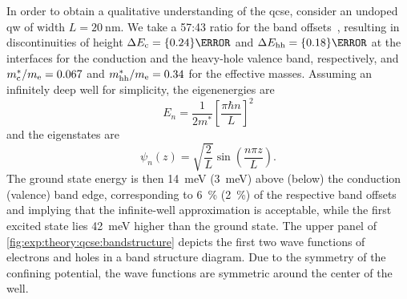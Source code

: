 In order to obtain a qualitative understanding of the \gls{qcse}, consider an undoped  \gls{qw} of width $L = \qty{20}{\nano\meter}$.
We take a 57:43 ratio for the band offsets~\cite{Miller1984a}, resulting in discontinuities of height $\Delta E_{\mr{c}} = \qty{0.24}{\electronvolt}$ and $\Delta E_{\mr{hh}} = \qty{0.18}{\electronvolt}$ at the interfaces for the conduction and the heavy-hole valence band, respectively, and $m^\ast_{\mathrm{c}}/m_{\mathrm{e}} = \num{0.067}$ and $m^\ast_{\mathrm{hh}}/m_{\mathrm{e}} = \num{0.34}$ for the effective masses.
Assuming an infinitely deep well for simplicity, the eigenenergies are
\begin{equation}\label{eq:exp:theory:square_well:eps}
    E_n = \frac{1}{2 m^\ast}\left[\frac{\pi\hbar n}{L}\right]^2
\end{equation}
and the eigenstates are
\begin{equation}\label{eq:exp:theory:square_well:psi}
    \psi_n(z) = \sqrt{\frac{2}{L}}\sin(\frac{n\pi z}{L}).
\end{equation}
The ground state energy is then \qty{14}{\milli\electronvolt} (\qty{3}{\milli\electronvolt}) above (below) the conduction (valence) band edge, corresponding to \qty{6}{\percent} (\qty{2}{\percent}) of the respective band offsets and implying that the infinite-well approximation is acceptable,
while the first excited state lies \qty{42}{\milli\electronvolt} higher than the ground state.
The upper panel of \cref{fig:exp:theory:qcse:bandstructure} depicts the first two wave functions of electrons and holes in a band structure diagram.
Due to the symmetry of the confining potential, the wave functions are symmetric around the center of the well.

